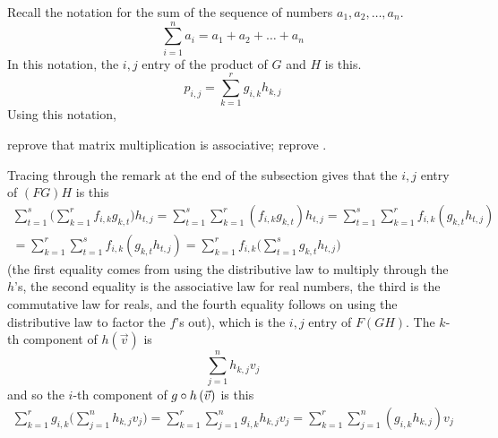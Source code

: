 \begin{exercises}
    Recall the notation for the sum of the sequence of numbers
    \( a_1, a_2, \dots, a_n \).
    \begin{equation*}
      \sum_{i=1}^{n}a_i=a_1+a_2+\dots+a_n
    \end{equation*}
    In this notation, the \( i,j \) entry of the product of \( G \) and
    \( H \) is this.
    \begin{equation*}
       p_{i,j}=\sum_{k=1}^{r} g_{i,k}h_{k,j}
    \end{equation*}
    Using this notation,
    \begin{exparts}
       \partsitem reprove that matrix multiplication is associative;
       \partsitem reprove .
    \end{exparts}
    \begin{answer}
       \begin{exparts}
         \partsitem Tracing through the remark at the end of the subsection
           gives that the \( i,j \) entry of \( (FG)H \) is this
           \begin{multline*}
             \sum_{t=1}^s\bigl(\sum_{k=1}^{r} f_{i,k}g_{k,t}\bigr)h_{t,j}
             =\sum_{t=1}^s\sum_{k=1}^{r} (f_{i,k}g_{k,t})h_{t,j} 
             =\sum_{t=1}^s\sum_{k=1}^{r} f_{i,k}(g_{k,t}h_{t,j})  \\ 
             =\sum_{k=1}^{r}\sum_{t=1}^s f_{i,k}(g_{k,t}h_{t,j}) 
             =\sum_{k=1}^{r}f_{i,k}\bigl(\sum_{t=1}^s g_{k,t}h_{t,j}\bigr)
           \end{multline*}
           (the first equality comes from using 
           the distributive law to multiply through
           the $h$'s, the second equality is the associative law for real
           numbers, the third is the commutative law for reals,
           and the fourth equality follows on using the distributive law to
           factor the $f$'s out),
           which is the \( i,j \) entry of \( F(GH) \).
         \partsitem The \( k \)-th component of \( h(\vec{v})\) is
           \begin{equation*}
             \sum_{j=1}^n h_{k,j}v_j
           \end{equation*}
           and so the \( i \)-th component of 
           \( g\mathbin\circ h\,(\vec{v}) \) is this
           \begin{multline*}
              \sum_{k=1}^r g_{i,k}\bigl(\sum_{j=1}^n h_{k,j}v_j\bigr) 
              =\sum_{k=1}^r \sum_{j=1}^n g_{i,k}h_{k,j}v_j   
              =\sum_{k=1}^r \sum_{j=1}^n (g_{i,k}h_{k,j})v_j
                                                              \\ 

\end{multline*}
\end{exparts}
\end{answer}
\end{exercises}
